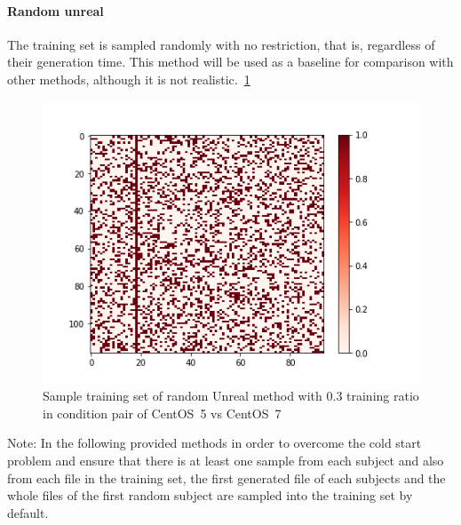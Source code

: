 \documentclass[10pt, conference, compsocconf]{IEEEtran}
\begin{document}
\paragraph{Random unreal}
The training set is sampled randomly with no restriction, that is,
regardless of their generation time.  This method will be used as a
baseline for comparison with other methods, although it is not
realistic.~\ref{fig:Random-Unreal-Sample-Training-set}
\begin{figure}
\includegraphics[width=\columnwidth]{figures/5vs7_random-unreal_03_training}
  \caption{Sample training set of random Unreal method with 0.3 training ratio in condition pair of CentOS~5 vs CentOS~7}
  \label{fig:Random-Unreal-Sample-Training-set}
\end{figure}

Note: In the following provided methods in order to overcome the cold start problem and ensure that there is 
at least one sample from each subject and also from each file in the training set, the first generated file of each 
subjects and the whole files of the first random subject are sampled into 
the training set by default. 

\end{document}

